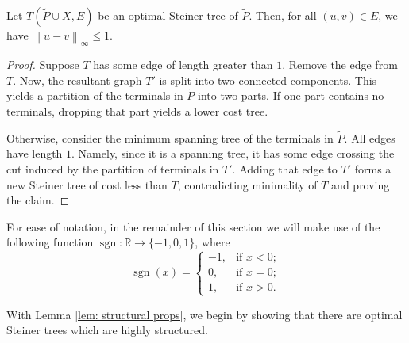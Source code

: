 \documentclass{theoretics}
\newcommand{\R}{\mathbb{R}}
\DeclareMathOperator{\sgn}{sgn}
\newcommand{\1}{\textbf{1}}
\newcommand{\norm}[1]{\left\lVert#1\right\rVert}
\renewcommand{\tilde}{\widetilde}
\begin{document}
\begin{lemma} \label{lem: max dist}
Let $T(\tilde{P} \cup X, E)$ be an optimal Steiner tree of $\tilde{P}$. Then, for all $(u,v) \in E$, we have $\norm{u - v}_{\infty} \leq 1.$
\end{lemma}
\begin{proof}
Suppose $T$ has some edge of length greater than $1$. Remove the edge from $T$. Now, the resultant graph $T'$ is split into two connected components. This yields a partition of the terminals in $\tilde{P}$ into two parts. If one part contains no terminals, dropping that part yields a lower cost tree. 

Otherwise,  consider the minimum spanning tree of the terminals in $\tilde{P}$. All edges have length $1$. Namely, since it is a spanning tree, it has some edge crossing the cut induced by the partition of terminals in $T'$. Adding that edge to $T'$ forms a new Steiner tree of cost less than $T$, contradicting minimality of $T$ and proving the claim.
\end{proof}

 For ease of notation, in the remainder of this section we will make use of the following function $\sgn: \R \to \{-1, 0, 1\}$, where 
\[
\sgn(x) = \begin{cases} 
-1, &\text{if } x < 0;\\
0, &\text{if } x = 0;\\
1, &\text{if } x > 0.
\end{cases}
\]

With Lemma \ref{lem: structural props}, we begin by showing that there are optimal Steiner trees which are highly structured.
\end{document}
